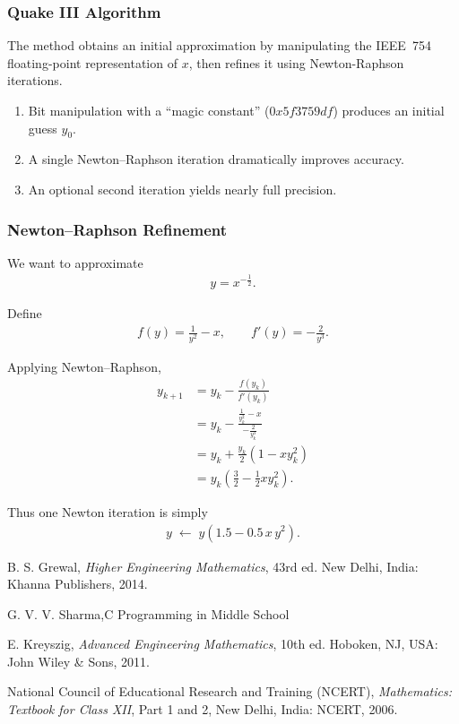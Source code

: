 \documentclass[conference]{IEEEtran}
\begin{document}
\subsubsection*{Quake III Algorithm}

\label{appendix:inv_sqrt}

The method obtains an initial approximation by manipulating the IEEE~754 floating-point representation of $x$, then refines it using Newton-Raphson iterations.

\begin{enumerate}
    \item Bit manipulation with a ``magic constant'' ($0x5f3759df$) produces an initial guess $y_0$.
    \item A single Newton--Raphson iteration dramatically improves accuracy.
    \item An optional second iteration yields nearly full precision. \\
\end{enumerate} 

\subsubsection*{Newton--Raphson Refinement}

We want to approximate
\begin{align} 
y = x^{-\frac{1}{2}}.
\end{align}

Define
\begin{align}
f(y) = \frac{1}{y^2} - x, \qquad f'(y) = -\frac{2}{y^3}.
\end{align}

Applying Newton--Raphson,
\begin{align}
y_{k+1} &= y_k - \frac{f(y_k)}{f'(y_k)} \\[6pt]
        &= y_k - \frac{\tfrac{1}{y_k^2} - x}{-\tfrac{2}{y_k^3}} \\[6pt]
        &= y_k + \frac{y_k}{2}\left(1 - x y_k^2 \right) \\[6pt]
        &= y_k \left(\tfrac{3}{2} - \tfrac{1}{2} x y_k^2\right).
\end{align}

Thus one Newton iteration is simply
\begin{align}
y \;\gets\; y \left( 1.5 - 0.5 \, x \, y^2 \right).
\end{align}



\begin{thebibliography}{00}

B. S. Grewal, \textit{Higher Engineering Mathematics}, 43rd ed. New Delhi, India: Khanna Publishers, 2014.

G. V. V. Sharma,C Programming in Middle School

E. Kreyszig, \textit{Advanced Engineering Mathematics}, 10th ed. Hoboken, NJ, USA: John Wiley \& Sons, 2011.

National Council of Educational Research and Training (NCERT), 
\textit{Mathematics: Textbook for Class XII}, Part 1 and 2, New Delhi, India: NCERT, 2006.

\end{thebibliography}
\end{document}
